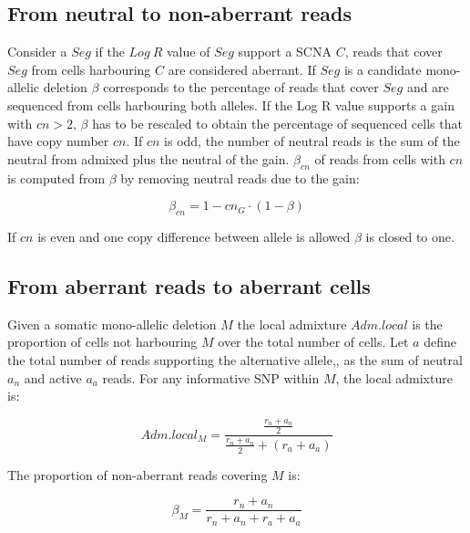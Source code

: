 	\subsection{From neutral to non-aberrant reads}
	Consider a $Seg$ if the $Log\ R$ value of $Seg$ support a SCNA $C$, reads that cover $Seg$ from cells harbouring $C$ are considered aberrant.
	If $Seg$ is a candidate mono-allelic deletion $\beta$ corresponds to the percentage of reads that cover $Seg$ and are sequenced from cells harbouring both alleles.
	If the Log R value supports a gain with $cn >2$, $\beta$ has to be rescaled to obtain the percentage of sequenced cells that have copy number $cn$.
	If $cn$ is odd, the number of neutral reads is the sum of the neutral from admixed plus the neutral of the gain.
	$\beta_{cn}$ of reads from cells with $cn$ is computed from $\beta$ by removing neutral reads due to the gain:

	$$\beta_{cn} = 1 - cn_{G}\cdot (1-\beta)$$

	If $cn$ is even and one copy difference between allele is allowed $\beta$ is closed to one.

	\subsection{From aberrant reads to aberrant cells}
	Given a somatic mono-allelic deletion $M$ the local admixture $Adm.local$ is the proportion of cells not harbouring $M$ over the total number of cells.
	Let $a$ define the total number of reads supporting the alternative allele,, as the sum of neutral $a_n$ and active $a_a$ reads.
	For any informative SNP within $M$, the local admixture is:

	$$Adm.local_M = \frac{\frac{r_n+a_n}{2}}{\frac{r_n+a_n}{2}+(r_a+a_a)}$$

	The proportion of non-aberrant reads covering $M$ is:

	$$\beta_M = \frac{r_n+a_n}{r_n+a_n+r_a+a_a}$$

